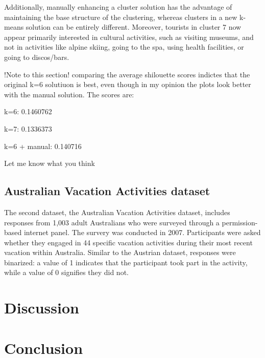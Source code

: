 \documentclass[article]{ajs}
\begin{document}
Additionally, manually enhancing a cluster solution has the advantage of maintaining the base structure of the clustering, whereas clusters in a new k-means solution can be entirely different. Moreover, tourists in cluster 7 now appear primarily interested in cultural activities, such as visiting museums, and not in activities like alpine skiing, going to the spa, using health facilities, or going to discos/bars.


!Note to this section! comparing the average shilouette scores indictes that the original k=6 solutiuon is best, even though in my opinion the plots look better with the manual solution. The scores are:

k=6: 0.1460762

k=7: 0.1336373

k=6 + manual: 0.140716

Let me know what you think


\subsection{Australian Vacation Activities dataset}

The second dataset, the Australian Vacation Activities dataset, includes responses from 1,003 adult Australians who were surveyed through a permission-based internet panel. The survery was conducted in 2007. Participants were asked whether they engaged in 44 specific vacation activities during their most recent vacation within Australia. Similar to the Austrian dataset, responses were binarized: a value of 1 indicates that the participant took part in the activity, while a value of 0 signifies they did not.


\section{Discussion}


\section{Conclusion}

%

\end{document}
